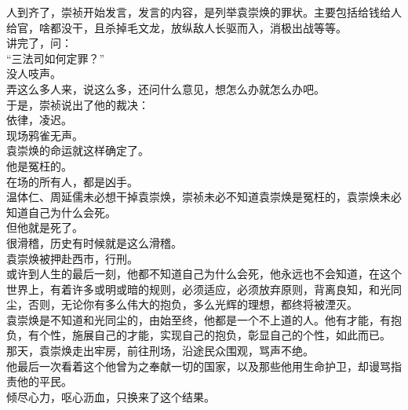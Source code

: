 \begin{multicols}{\theparacolNo}
人到齐了，崇祯开始发言，发言的内容，是列举袁崇焕的罪状。主要包括给钱给人给官，啥都没干，且杀掉毛文龙，放纵敌人长驱而入，消极出战等等。\\

讲完了，问：\\

“三法司如何定罪？”\\

没人吱声。\\

弄这么多人来，说这么多，还问什么意见，想怎么办就怎么办吧。\\

于是，崇祯说出了他的裁决：\\

依律，凌迟。\\

现场鸦雀无声。\\

袁崇焕的命运就这样确定了。\\

他是冤枉的。\\

在场的所有人，都是凶手。\\

温体仁、周延儒未必想干掉袁崇焕，崇祯未必不知道袁崇焕是冤枉的，袁崇焕未必知道自己为什么会死。\\

但他就是死了。\\

很滑稽，历史有时候就是这么滑稽。\\

袁崇焕被押赴西市，行刑。\\

或许到人生的最后一刻，他都不知道自己为什么会死，他永远也不会知道，在这个世界上，有着许多或明或暗的规则，必须适应，必须放弃原则，背离良知，和光同尘，否则，无论你有多么伟大的抱负，多么光辉的理想，都终将被湮灭。\\

袁崇焕是不知道和光同尘的，由始至终，他都是一个不上道的人。他有才能，有抱负，有个性，施展自己的才能，实现自己的抱负，彰显自己的个性，如此而已。\\

那天，袁崇焕走出牢房，前往刑场，沿途民众围观，骂声不绝。\\

他最后一次看着这个他曾为之奉献一切的国家，以及那些他用生命护卫，却谩骂指责他的平民。\\

倾尽心力，呕心沥血，只换来了这个结果。\\


\end{multicols}

